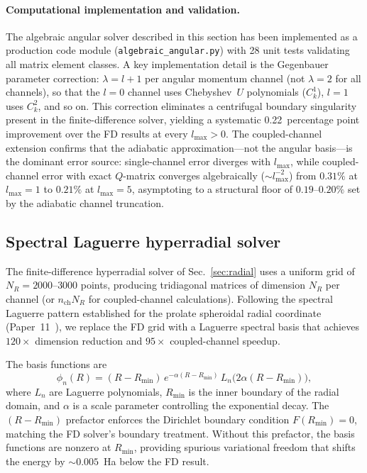 \documentclass[aps,pra,twocolumn,superscriptaddress,longbibliography]{revtex4-2}
\begin{document}
\paragraph{Computational implementation and validation.}
The algebraic angular solver described in this section has been
implemented as a production code module (\texttt{algebraic\_angular.py})
with 28 unit tests validating all matrix element classes.  A key
implementation detail is the Gegenbauer parameter correction:
$\lambda = l + 1$ per angular momentum channel (not $\lambda = 2$
for all channels), so that the $l = 0$ channel uses Chebyshev~$U$
polynomials ($C_k^1$), $l = 1$ uses $C_k^2$, and so on.  This
correction eliminates a centrifugal boundary singularity present in
the finite-difference solver, yielding a systematic 0.22~percentage
point improvement over the FD results at every $l_{\max} > 0$.
The coupled-channel extension confirms that the adiabatic
approximation---not the angular basis---is the dominant error source:
single-channel error diverges with $l_{\max}$, while coupled-channel
error with exact $Q$-matrix converges algebraically
($\sim l_{\max}^{-2}$) from $0.31\%$ at $l_{\max} = 1$ to $0.21\%$
at $l_{\max} = 5$, asymptoting to a structural floor of
$0.19$--$0.20\%$ set by the adiabatic channel truncation.

\subsection{Spectral Laguerre hyperradial solver}
\label{sec:spectral_radial}

The finite-difference hyperradial solver of Sec.~\ref{sec:radial} uses
a uniform grid of $N_R = 2000$--$3000$ points, producing tridiagonal
matrices of dimension $N_R$ per channel (or $n_{\mathrm{ch}} N_R$ for
coupled-channel calculations).  Following the spectral Laguerre pattern
established for the prolate spheroidal radial coordinate
(Paper~11~\cite{loutey_paper11}), we replace the FD grid with a
Laguerre spectral basis that achieves $120\times$ dimension reduction
and $95\times$ coupled-channel speedup.

The basis functions are
\begin{equation}
  \phi_n(R) = (R - R_{\min})\,
  e^{-\alpha(R - R_{\min})}\,
  L_n\!\bigl(2\alpha(R - R_{\min})\bigr),
  \label{eq:laguerre_radial}
\end{equation}
where $L_n$ are Laguerre polynomials, $R_{\min}$ is the inner boundary
of the radial domain, and $\alpha$ is a scale parameter controlling the
exponential decay.  The $(R - R_{\min})$ prefactor enforces the Dirichlet
boundary condition $F(R_{\min}) = 0$, matching the FD solver's boundary
treatment.  Without this prefactor, the basis functions are nonzero at
$R_{\min}$, providing spurious variational freedom that shifts the energy
by $\sim\!0.005$~Ha below the FD result.
\end{document}
